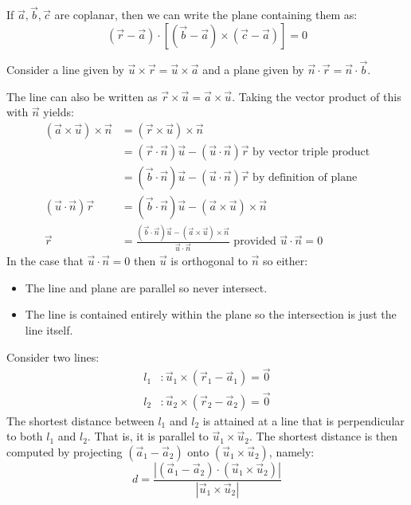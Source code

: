 \documentclass[../main.tex]{subfiles}
\begin{document}
If $\vec{a}, \vec{b}, \vec{c}$ are coplanar, then we can write the plane containing them as:
\[
  (\vec{r} - \vec{a}) \cdot [(\vec{b} - \vec{a}) \times (\vec{c} - \vec{a})] = 0
\]
\begin{example}
  Consider a line given by $\vec{u} \times \vec{r} = \vec{u} \times \vec{a}$ and a plane given by $\vec{n} \cdot \vec{r} = \vec{n} \cdot \vec{b}$.

  The line can also be written as $\vec{r} \times \vec{u} = \vec{a} \times \vec{u}$.
  Taking the vector product of this with $\vec{n}$ yields:
  \begin{align*}
    (\vec{a} \times \vec{u}) \times \vec{n} &= (\vec{r} \times \vec{u}) \times \vec{n}\\
                                            &= (\vec{r} \cdot \vec{n}) \vec{u} - (\vec{u} \cdot \vec{n}) \vec{r} \text{ by vector triple product}\\
                                            &= (\vec{b} \cdot \vec{n}) \vec{u} - (\vec{u} \cdot \vec{n}) \vec{r} \text{ by definition of plane}\\
    (\vec{u} \cdot \vec{n})\vec{r} &= (\vec{b} \cdot \vec{n}) \vec{u} - (\vec{a} \times \vec{u}) \times \vec{n}\\
    \vec{r} &= \frac{(\vec{b} \cdot\vec{n})\vec{u} - (\vec{a} \times \vec{u})\times\vec{n}}{\vec{u} \cdot\vec{n}} \text{ provided $\vec{u} \cdot \vec{n} = 0$}
  \end{align*}
  In the case that $\vec{u} \cdot \vec{n} = 0$ then $\vec{u}$ is orthogonal to $\vec{n}$ so either:
  \begin{itemize}
    \item The line and plane are parallel so never intersect.
    \item The line is contained entirely within the plane so the intersection is just the line itself.
  \end{itemize}
\end{example}
\begin{example}
 Consider two lines:
 \begin{align*}
    l_1&: \vec{u}_1 \times (\vec{r}_1 - \vec{a}_1) = \vec{0} \\
    l_2&: \vec{u}_2 \times (\vec{r}_2 - \vec{a}_2) = \vec{0}
 \end{align*}
 The shortest distance between $l_1$ and $l_2$ is attained at a line that is perpendicular to both $l_1$ and $l_2$.
 That is, it is parallel to $\vec{u}_1 \times \vec{u}_2$.
 The shortest distance is then computed by projecting $(\vec{a}_1 - \vec{a}_2)$ onto $(\vec{u}_1 \times \vec{u}_2)$, namely:
 \[
   d = \frac{|(\vec{a}_1 - \vec{a}_2) \cdot (\vec{u}_1 \times \vec{u}_2)|}{|\vec{u}_1 \times \vec{u}_2|}
 \]
\end{example}
\end{document}
